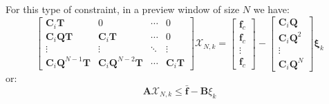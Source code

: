 \-For this type of constraint, in a preview window of size $N$ we have\-: \[ \left[\begin{array}{cccc} \mathbf{C}_i\mathbf{T} & 0 & \cdots & 0 \\ \mathbf{C}_i\mathbf{Q}\mathbf{T} & \mathbf{C}_i\mathbf{T} & \cdots & 0 \\ \vdots & \vdots & \ddots & \vdots \\ \mathbf{C}_i\mathbf{Q}^{N-1}\mathbf{T} & \mathbf{C}_i\mathbf{Q}^{N-2}\mathbf{T} & \cdots & \mathbf{C}_i\mathbf{T} \end{array}\right] \mathbf{\mathcal{X}}_{N,k} = \left[\begin{array}{c} \mathbf{f}_c\\ \mathbf{f}_c\\ \vdots\\ \mathbf{f}_c \end{array}\right] - \left[\begin{array}{c} \mathbf{C}_i\mathbf{Q}\\ \mathbf{C}_i\mathbf{Q}^2\\ \vdots\\ \mathbf{C}_i\mathbf{Q}^N \end{array}\right] \mathbf{\xi}_k \] or\-: \[ \mathbf{A} \mathbf{\mathcal{X}}_{N,k} \leq \bar{\mathbf{f}} - \mathbf{B}\xi_k \] 

